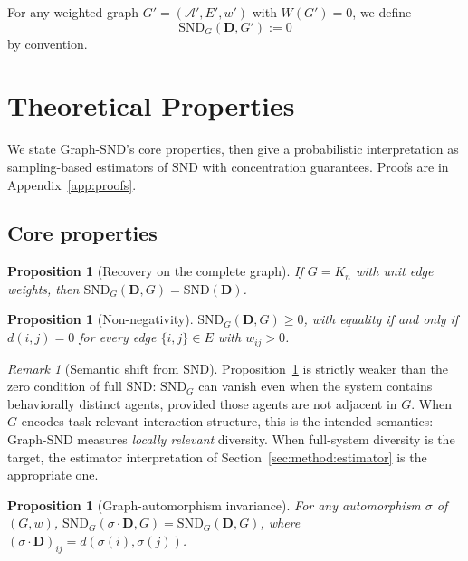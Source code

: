 \documentclass{article}
\theoremstyle{plain}
\newtheorem{proposition}[theorem]{Proposition}
\theoremstyle{definition}
\theoremstyle{remark}
\newtheorem{remark}[theorem]{Remark}
\newcommand{\Agents}{\mathcal{A}}        %
\newcommand{\SND}{\ensuremath{\mathrm{SND}}}
\newcommand{\SNDG}{\mathrm{SND}_{G}}
\begin{document}
For any weighted graph $G' = (\Agents', E', w')$ with $W(G') = 0$, we define
\[
\SNDG(\mathbf{D}, G') := 0
\]
by convention.

\section{Theoretical Properties}
\label{sec:theory}

We state Graph-SND's core properties, then give a probabilistic
interpretation as sampling-based estimators of $\SND$ with concentration
guarantees. Proofs are in Appendix~\ref{app:proofs}.

\subsection{Core properties}

\begin{proposition}[Recovery on the complete graph]
\label{prop:recovery}
If $G = K_n$ with unit edge weights, then
$\SNDG(\mathbf{D}, G) = \SND(\mathbf{D})$.
\end{proposition}

\begin{proposition}[Non-negativity]
\label{prop:nonneg}
$\SNDG(\mathbf{D}, G) \geq 0$, with equality if and only if $d(i,j) = 0$
for every edge $\{i,j\} \in E$ with $w_{ij} > 0$.
\end{proposition}

\begin{remark}[Semantic shift from $\SND$]
\label{rem:semantics}
Proposition~\ref{prop:nonneg} is strictly weaker than the zero condition
of full $\SND$: $\SNDG$ can vanish even when the system contains
behaviorally distinct agents, provided those agents are not adjacent in
$G$. When $G$ encodes task-relevant interaction structure, this is the
intended semantics: Graph-SND measures \emph{locally relevant}
diversity. When full-system diversity is the target, the estimator
interpretation of Section~\ref{sec:method:estimator} is the appropriate
one.
\end{remark}

\begin{proposition}[Graph-automorphism invariance]
\label{prop:perm}
For any automorphism $\sigma$ of $(G, w)$,
$\SNDG(\sigma \cdot \mathbf{D}, G) = \SNDG(\mathbf{D}, G)$, where
$(\sigma \cdot \mathbf{D})_{ij} = d(\sigma(i), \sigma(j))$.
\end{proposition}
\end{document}
